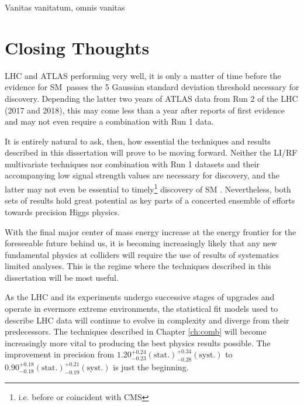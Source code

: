 \begin{savequote}[75mm]
Vanitas vanitatum, omnis vanitas
\end{savequote}

\chapter{Closing Thoughts}

 LHC and ATLAS performing very well, it is only a matter of time before the evidence for SM \vhbb\,passes the 5 Gaussian standard deviation threshold necessary for discovery.  Depending the latter two years of ATLAS data from Run 2 of the LHC (2017 and 2018), this may come less than a year after reports of first evidence and may not even require a combination with Run 1 data.  

It is entirely natural to ask, then, how essential the techniques and results described in this dissertation will prove to be moving forward.  Neither the LI/RF multivariate techniques nor combination with Run 1 datasets and their accompanying low signal strength values are necessary for discovery, and the latter may not even be essential to timely\footnote{i.e. before or coincident with CMS} discovery of SM \vhbb.  Nevertheless, both sets of results hold great potential as key parts of a concerted ensemble of efforts towards precision Higgs physics.

With the final major center of mass energy increase at the energy frontier for the foreseeable future behind us, it is becoming increasingly likely that any new fundamental physics at colliders will require the use of results of systematics limited analyses.  This is the regime where the techniques described in this dissertation will be most useful.

As the LHC and its experiments undergo successive stages of upgrades and operate in evermore extreme environments, the statistical fit models used to describe LHC data will continue to evolve in complexity and diverge from their predecessors.  The techniques described in Chapter \ref{ch:comb} will become increasingly more vital to producing the best physics results possible.  The improvement in precision from $1.20^{+0.24}_{-0.23}(\textrm{stat.})^{+0.34}_{-0.28}(\textrm{syst.})$ to $0.90^{+0.18}_{-0.18}(\textrm{stat.})^{+0.21}_{-0.19}(\textrm{syst.})$ is just the beginning.

